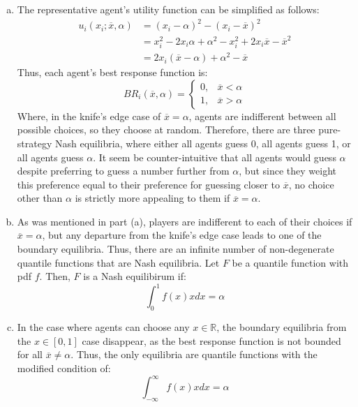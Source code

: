 \documentclass{article}
\newcommand{\R}{\mathbb{R}}
\newcommand{\olx}{\overline{x}}
\begin{document}
\begin{enumerate}[(a)]
	\item The representative agent's utility function can be simplified as follows:
		\begin{align*}
			u_i(x_i;\olx,\alpha) 	&= (x_i-\alpha)^2 - (x_i-\olx)^2	\\
									&= x_i^2 - 2x_i\alpha + \alpha^2 - x_i^2 + 2x_i\olx - \olx^2	\\
									&= 2x_i(\olx - \alpha) + \alpha^2 - \olx
		\end{align*}
		Thus, each agent's best response function is:
		\[
			BR_i(\olx,\alpha) =
				\begin{cases}
					0, &\olx<\alpha	\\
					1, &\olx>\alpha
				\end{cases}
		\]
		Where, in the knife's edge case of $\olx=\alpha$, agents are indifferent between all possible choices, so they choose at random. Therefore, there are three pure-strategy Nash equilibria, where either all agents guess 0, all agents guess 1, or all agents guess $\alpha$. It seem be counter-intuitive that all agents would guess $\alpha$ despite preferring to guess a number further from $\alpha$, but since they weight this preference equal to their preference for guessing closer to $\olx$, no choice other than $\alpha$ is strictly more appealing to them if ${\olx=\alpha}$.
		
	\item As was mentioned in part (a), players are indifferent to each of their choices if ${\olx=\alpha}$, but any departure from the knife's edge case leads to one of the boundary equilibria. Thus, there are an infinite number of non-degenerate quantile functions that are Nash equilibria. Let $F$ be a quantile function with pdf $f$. Then, $F$ is a Nash equilibirum if:
		\[
			\int_0^1f(x)xdx = \alpha
		\]
	
	\item In the case where agents can choose any $x\in\R$, the boundary equilibria from the $x\in[0,1]$ case disappear, as the best response function is not bounded for all $\olx\neq\alpha$. Thus, the only equilibria are quantile functions with the modified condition of:
		\[
			\int_{-\infty}^\infty f(x)xdx = \alpha
		\]
	
\end{enumerate}

\pagebreak
\end{document}
